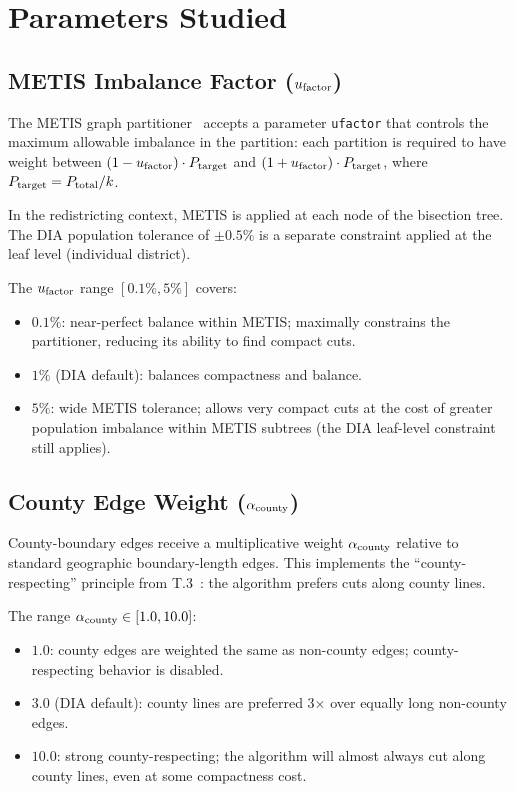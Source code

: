 \section{Parameters Studied}
\label{sec:parameters}

\subsection{METIS Imbalance Factor ($u_{\mathrm{factor}}$)}

The METIS graph partitioner~\citep{karypis2013manual} accepts a parameter
\texttt{ufactor} that controls the maximum allowable imbalance in the
partition: each partition is required to have weight between
$(1 - u_{\mathrm{factor}}) \cdot P_{\rm target}$ and $(1 + u_{\mathrm{factor}}) \cdot P_{\rm target}$,
where $P_{\rm target} = P_{\rm total} / k$.

In the redistricting context, METIS is applied at each node of the
\ar{} bisection tree.
The DIA population tolerance of $\pm 0.5\%$ is a separate constraint
applied at the leaf level (individual district).

The $u_{\mathrm{factor}}$ range $[0.1\%, 5\%]$ covers:
\begin{itemize}
\item $0.1\%$: near-perfect balance within METIS; maximally constrains
      the partitioner, reducing its ability to find compact cuts.
\item $1\%$ (DIA default): balances compactness and balance.
\item $5\%$: wide METIS tolerance; allows very compact cuts at the cost
      of greater population imbalance within METIS subtrees (the DIA
      leaf-level constraint still applies).
\end{itemize}

\subsection{County Edge Weight ($\alpha_{\mathrm{county}}$)}

County-boundary edges receive a multiplicative weight $\alpha_{\mathrm{county}}$ relative
to standard geographic boundary-length edges.
This implements the ``county-respecting'' principle from T.3~\citep{b10paper}:
the algorithm prefers cuts along county lines.

The range $\alpha_{\mathrm{county}} \in [1.0, 10.0]$:
\begin{itemize}
\item $1.0$: county edges are weighted the same as non-county edges;
      county-respecting behavior is disabled.
\item $3.0$ (DIA default): county lines are preferred 3$\times$ over
      equally long non-county edges.
\item $10.0$: strong county-respecting; the algorithm will almost always
      cut along county lines, even at some compactness cost.
\end{itemize}

